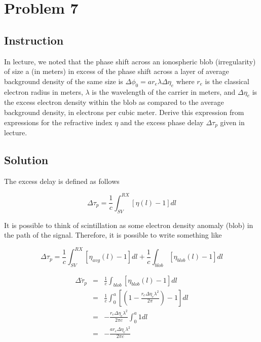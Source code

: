 \section{Problem 7}

\subsection{Instruction}

In lecture, we noted that the phase shift across an ionospheric blob
(irregularity) of size a (in meters) in excess of the phase shift across a layer
of average background density of the same size is
$\Delta \phi_0 = a r_e \lambda \Delta\eta_e$ where $r_e$ is the classical
electron radius in meters, $\lambda$ is the wavelength of the carrier in meters,
and $\Delta \eta_e$ is the excess electron density within the blob as compared
to the average background density, in electrons per cubic meter. Derive this
expression from expressions for the refractive index $\eta$ and the excess phase
delay $\Delta \tau_p$ given in lecture.

\subsection{Solution}

The excess delay is defined as follows

\begin{equation}
	\Delta \tau_p = \frac{1}{c} \int_{SV}^{RX} \left[ \eta(l) - 1 \right] dl
	\label{eq:excess_delay}
\end{equation}

It is possible to think of scintillation as some electron density anomaly (blob)
in the path of the signal. Therefore, it is possible to write something like

\begin{equation*}
	\Delta \tau_p = \frac{1}{c} \int_{SV}^{RX} \left[ \eta_{avg}(l) - 1 \right] dl
	+ \frac{1}{c} \int_{blob} \left[ \eta_{blob}(l) - 1 \right] dl
\end{equation*}


\begin{eqnarray*}
	\Delta \tilde{\tau}_p &=& \frac{1}{c} \int_{blob} \left[ \eta_{blob}(l) - 1 \right] dl \\
	&=& \frac{1}{c} \int_{0}^{a} \left[ (1 - \frac{r_e \Delta \eta_e \lambda^2}{2 \pi} ) - 1 \right] dl \\
	&=& - \frac{r_e \Delta \eta_e \lambda^2}{2 \pi c}  \int_{0}^{a} 1 dl \\
	&=& - \frac{a r_e \Delta \eta_e \lambda^2}{2 \pi c}
\end{eqnarray*}

